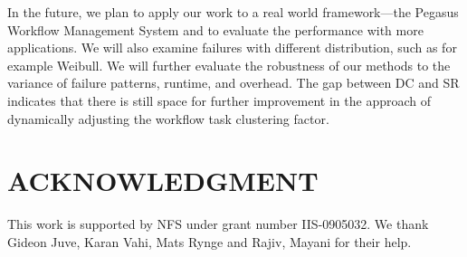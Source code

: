 \documentclass{IOS-Book-Article}
\begin{document}
In the future, we plan to apply our work to a real world framework---the Pegasus Workflow Management System and to evaluate the performance with more applications. We will also examine failures with different distribution, such as for example Weibull.  We will further evaluate the robustness of our methods to the variance of failure patterns, runtime, and overhead. The gap between DC and SR indicates that there is still space for further improvement in the approach of dynamically adjusting the workflow task clustering factor. 

\section{ACKNOWLEDGMENT}
This work is supported by NFS under grant number IIS-0905032. We thank Gideon Juve, Karan Vahi, Mats Rynge and Rajiv, Mayani for their help. 



\end{document}
